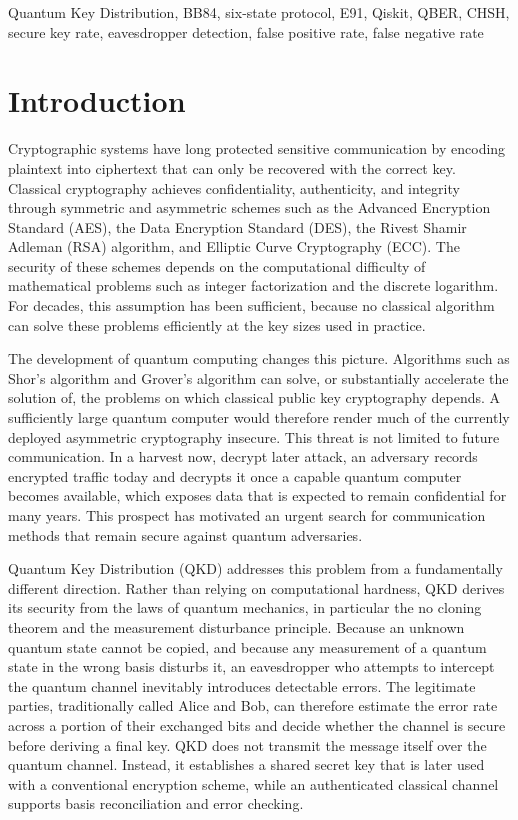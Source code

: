 \documentclass[conference]{IEEEtran}
\begin{document}
\begin{IEEEkeywords}
 Quantum Key Distribution, BB84, six-state protocol, E91, Qiskit, QBER, CHSH, secure key rate, eavesdropper detection, false positive rate, false negative rate
\end{IEEEkeywords}

\section{Introduction}

Cryptographic systems have long protected sensitive communication by encoding
plaintext into ciphertext that can only be recovered with the correct key.
Classical cryptography achieves confidentiality, authenticity, and integrity
through symmetric and asymmetric schemes such as the Advanced Encryption
Standard (AES), the Data Encryption Standard (DES), the Rivest Shamir Adleman
(RSA) algorithm, and Elliptic Curve Cryptography (ECC). The security of these
schemes depends on the computational difficulty of mathematical problems such
as integer factorization and the discrete logarithm. For decades, this
assumption has been sufficient, because no classical algorithm can solve these
problems efficiently at the key sizes used in practice.

The development of quantum computing changes this picture. Algorithms such as
Shor's algorithm and Grover's algorithm can solve, or substantially accelerate
the solution of, the problems on which classical public key cryptography
depends. A sufficiently large quantum computer would therefore render much of
the currently deployed asymmetric cryptography insecure. This threat is not
limited to future communication. In a harvest now, decrypt later attack, an
adversary records encrypted traffic today and decrypts it once a capable
quantum computer becomes available, which exposes data that is expected to
remain confidential for many years. This prospect has motivated an urgent
search for communication methods that remain secure against quantum
adversaries.

Quantum Key Distribution (QKD) addresses this problem from a fundamentally
different direction. Rather than relying on computational hardness, QKD derives
its security from the laws of quantum mechanics, in particular the no cloning
theorem and the measurement disturbance principle. Because an unknown quantum
state cannot be copied, and because any measurement of a quantum state in the
wrong basis disturbs it, an eavesdropper who attempts to intercept the quantum
channel inevitably introduces detectable errors. The legitimate parties,
traditionally called Alice and Bob, can therefore estimate the error rate
across a portion of their exchanged bits and decide whether the channel is
secure before deriving a final key. QKD does not transmit the message itself
over the quantum channel. Instead, it establishes a shared secret key that is
later used with a conventional encryption scheme, while an authenticated
classical channel supports basis reconciliation and error checking.
\end{document}
